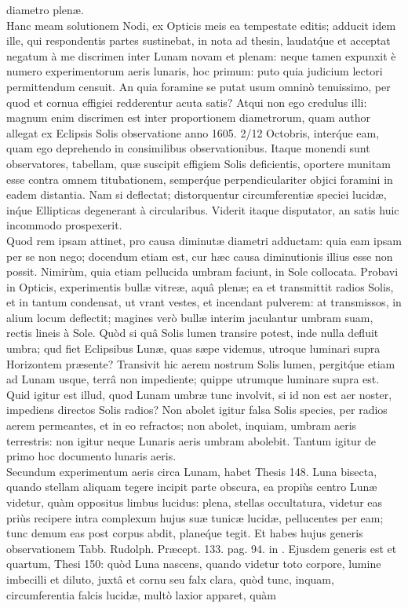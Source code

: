 \documentclass[a4paper, 11pt, oneside, polutonikogreek, german]{article}
\begin{document}
diametro plenæ.\\\hspace*{5mm}Hanc meam solutionem Nodi, ex Opticis meis ea tempestate editis; adducit idem ille, qui respondentis partes sustinebat, in nota ad thesin, laudat\'que et acceptat negatum à me discrimen inter Lunam novam et plenam: neque tamen expunxit è numero experimentorum aeris lunaris, hoc primum: puto quia judicium lectori permittendum censuit. An quia foramine se putat usum omninò tenuissimo, per quod et cornua effigiei redderentur acuta satis? Atqui non ego credulus illi: magnum enim discrimen est inter proportionem diametrorum, quam author allegat ex Eclipsis Solis observatione anno 1605. 2/12 Octobris, inter\'que eam, quam ego deprehendo in consimilibus observationibus. Itaque monendi sunt observatores, tabellam, quæ suscipit effigiem Solis deficientis, oportere munitam esse contra omnem titubationem, semper\'que perpendiculariter objici foramini in eadem distantia. Nam si deflectat; distorquentur circumferentiæ speciei lucidæ, in\'que Ellipticas degenerant à circularibus. Viderit itaque disputator, an satis huic incommodo prospexerit.\\\hspace*{5mm}Quod rem ipsam attinet, pro causa diminutæ diametri adductam: quia eam ipsam per se non nego; docendum etiam est, cur hæc causa diminutionis illius esse non possit. Nimirùm, quia etiam pellucida umbram faciunt, in Sole collocata. Probavi in Opticis, experimentis bullæ vitreæ, aquâ plenæ; ea et transmittit radios Solis, et in tantum condensat, ut vrant vestes, et incendant pulverem: at transmissos, in alium locum deflectit; magines verò bullæ interim jaculantur umbram suam, rectis lineis à Sole. Quòd si quâ Solis lumen transire potest, inde nulla defluit umbra; qud fiet Eclipsibus Lunæ, quas sæpe videmus, utroque luminari supra Horizontem præsente? Transivit hic aerem nostrum Solis lumen, pergit\'que etiam ad Lunam usque, terrâ non impediente; quippe utrumque luminare supra est. Quid igitur est illud, quod Lunam umbræ tunc involvit, si id non est aer noster, impediens directos Solis radios? Non abolet igitur falsa Solis species, per radios aerem permeantes, et in eo refractos; non abolet, inquiam, umbram aeris terrestris: non igitur neque Lunaris aeris umbram abolebit. Tantum igitur de primo hoc documento lunaris aeris.\\\hspace*{5mm}Secundum experimentum aeris circa Lunam, habet Thesis 148. Luna bisecta, quando stellam aliquam tegere incipit parte obscura, ea propiùs centro Lunæ videtur, quàm oppositus limbus lucidus: plena, stellas occultatura, videtur eas priùs recipere intra complexum hujus suæ tunicæ lucidæ, pellucentes per eam; tunc demum eas post corpus abdit, plane\'que tegit. Et habes hujus generis observationem Tabb. Rudolph. Præcept. 133. pag. 94. in \mars\hspace*{0.5mm}\rightmoon\hspace*{0.5mm}\venus. Ejusdem generis est et quartum, Thesi 150: quòd Luna nascens, quando videtur toto corpore, lumine imbecilli et diluto, juxtâ et cornu seu falx clara, quòd tunc, inquam, circumferentia falcis lucidæ, multò laxior apparet, quàm 
\end{document}
